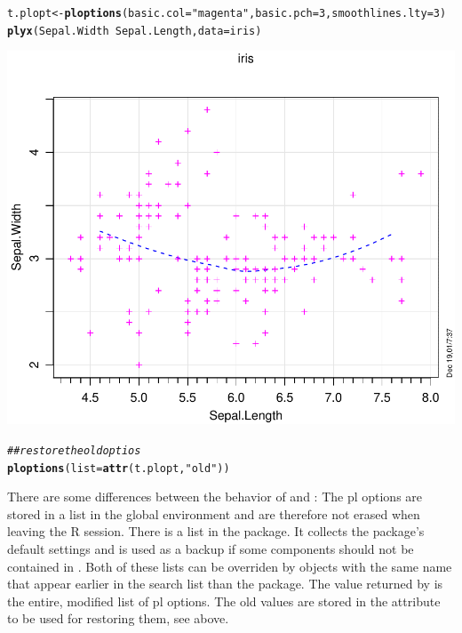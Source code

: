 \documentclass[11pt]{article}\usepackage[]{graphicx}\usepackage[]{color}
\makeatletter
\def\maxwidth{ %
  \ifdim\Gin@nat@width>\linewidth
    \linewidth
  \else
    \Gin@nat@width
  \fi
}
\newcommand{\hlnum}[1]{\textcolor[rgb]{0.686,0.059,0.569}{#1}}%
\newcommand{\hlstr}[1]{\textcolor[rgb]{0.192,0.494,0.8}{#1}}%
\newcommand{\hlcom}[1]{\textcolor[rgb]{0.678,0.584,0.686}{\textit{#1}}}%
\newcommand{\hlopt}[1]{\textcolor[rgb]{0,0,0}{#1}}%
\newcommand{\hlstd}[1]{\textcolor[rgb]{0.345,0.345,0.345}{#1}}%
\newcommand{\hlkwb}[1]{\textcolor[rgb]{0.69,0.353,0.396}{#1}}%
\newcommand{\hlkwc}[1]{\textcolor[rgb]{0.333,0.667,0.333}{#1}}%
\newcommand{\hlkwd}[1]{\textcolor[rgb]{0.737,0.353,0.396}{\textbf{#1}}}%
\newenvironment{kframe}{%
 \def\at@end@of@kframe{}%
 \ifinner\ifhmode%
  \def\at@end@of@kframe{\end{minipage}}%
  \begin{minipage}{\columnwidth}%
 \fi\fi%
 \def\FrameCommand##1{\hskip\@totalleftmargin \hskip-\fboxsep
 \colorbox{shadecolor}{##1}\hskip-\fboxsep
     \hskip-\linewidth \hskip-\@totalleftmargin \hskip\columnwidth}%
 \MakeFramed {\advance\hsize-\width
   \@totalleftmargin\z@ \linewidth\hsize
   \@setminipage}}%
 {\par\unskip\endMakeFramed%
 \at@end@of@kframe}
\newenvironment{knitrout}{}{} %
\makeatother
\begin{document}
\begin{knitrout}
\color{fgcolor}\begin{kframe}
\begin{alltt}
\hlstd{t.plopt} \hlkwb{<-} \hlkwd{ploptions}\hlstd{(}\hlkwc{basic.col}\hlstd{=}\hlstr{"magenta"}\hlstd{,} \hlkwc{basic.pch}\hlstd{=}\hlnum{3}\hlstd{,} \hlkwc{smoothlines.lty}\hlstd{=}\hlnum{3}\hlstd{)}
\hlkwd{plyx}\hlstd{(Sepal.Width}\hlopt{~}\hlstd{Sepal.Length,} \hlkwc{data}\hlstd{=iris)}
\end{alltt}
\end{kframe}
\includegraphics[width=\maxwidth]{figure/ploptions-1} 
\begin{kframe}\begin{alltt}
\hlcom{## restore the old optios}
\hlkwd{ploptions}\hlstd{(}\hlkwc{list}\hlstd{=}\hlkwd{attr}\hlstd{(t.plopt,} \hlstr{"old"}\hlstd{))}
\end{alltt}
\end{kframe}
\end{knitrout}

There are some differences between the behavior of  and :
\Itm
The pl options are stored in a list  in the global
environment and are therefore not erased when leaving the R session. 
\Itm
There is a list  in the package. It collects the
package's default settings and is used as a backup if some components should
not be contained in .
\Itm
Both of these lists can be overriden by objects with the same name
that appear earlier in the search list than the  package.
\Itm
The value returned by  is the entire, modified list of 
pl options. The old values are stored in the attribute 
to be used for restoring them, see above.
\end{document}
